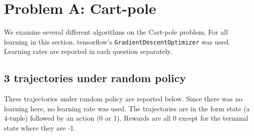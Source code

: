 \documentclass[paper=a4, fontsize=11pt]{scrartcl} %
\numberwithin{equation}{section} %
\numberwithin{figure}{section} %
\numberwithin{table}{section} %
\begin{document}
\newpage



\maketitle %


\section{Problem A: Cart-pole}

We examine several different algorithms on the Cart-pole problem. For all learning in this section, tensorflow's \texttt{GradientDescentOptimizer} was used. Learning rates are reported in each question separately.\\

\subsection{3 trajectories under random policy}
Three trajectories under random policy are reported below. Since there was no learning here, no learning rate was used. The trajectories are in the form state (a 4-tuple) followed by an action (0 or 1). Rewards are all 0 except for the terminal state where they are -1.\\
\end{document}
